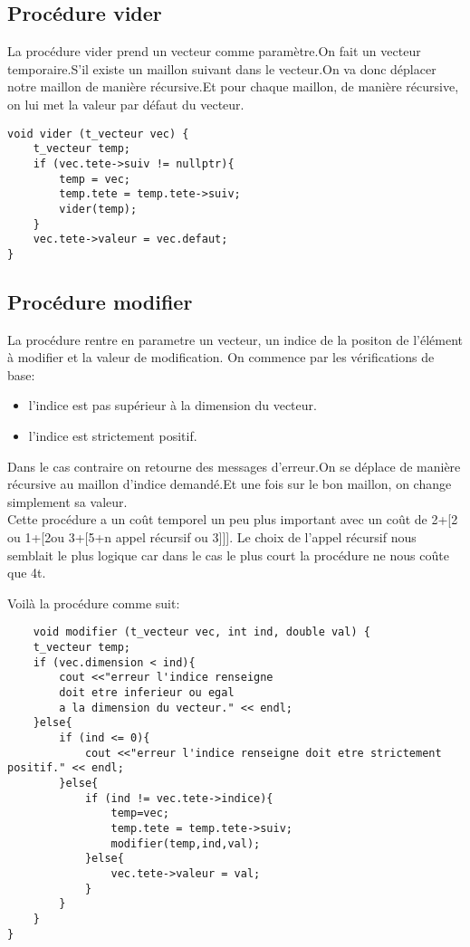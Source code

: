 \documentclass[a4paper,11pt,final]{article}
\begin{document}
\subsection{Procédure vider}
La procédure vider prend un vecteur comme paramètre.On fait un vecteur temporaire.S'il existe un maillon suivant dans le vecteur.On va donc déplacer notre maillon de manière récursive.Et pour chaque maillon, de manière récursive, on lui met la valeur par défaut du vecteur.
\begin{verbatim}
void vider (t_vecteur vec) {
    t_vecteur temp;
    if (vec.tete->suiv != nullptr){
        temp = vec;
        temp.tete = temp.tete->suiv;
        vider(temp);
    }
    vec.tete->valeur = vec.defaut;
}
\end{verbatim}

\subsection{Procédure modifier}
La procédure rentre en parametre un vecteur, un indice de la positon de l'élément à modifier et la valeur de modification. On commence par les vérifications de base:
\begin{itemize}
    \item l'indice est pas supérieur à la dimension du vecteur.
    \item l'indice est strictement positif.
\end{itemize}
Dans le cas contraire on retourne des messages d'erreur.On se déplace de manière récursive au maillon d'indice demandé.Et une fois sur le bon maillon, on change simplement sa valeur.\\ Cette procédure a un coût temporel un peu plus important avec un coût de 2+[2 ou 1+[2ou 3+[5+n appel récursif ou 3]]]. Le choix de l'appel récursif nous semblait le plus logique car dans le cas le plus court la procédure ne nous coûte que 4t.

Voilà la procédure comme suit:
\begin{verbatim}
    void modifier (t_vecteur vec, int ind, double val) {
    t_vecteur temp;
    if (vec.dimension < ind){
        cout <<"erreur l'indice renseigne
        doit etre inferieur ou egal
        a la dimension du vecteur." << endl;
    }else{
        if (ind <= 0){
            cout <<"erreur l'indice renseigne doit etre strictement positif." << endl;
        }else{
            if (ind != vec.tete->indice){
                temp=vec;
                temp.tete = temp.tete->suiv;
                modifier(temp,ind,val);
            }else{
                vec.tete->valeur = val;
            }
        }
    }
}
\end{verbatim}
\end{document}
